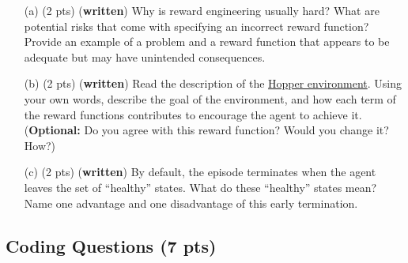 \documentclass{article}
\begin{document}
\begin{enumerate}

    \item[(a) (2 pts)] (\textbf{written}) Why is reward engineering usually hard? What are potential risks that come with specifying an incorrect reward function? Provide an example of a problem and a reward function that appears to be adequate but may have unintended consequences.

    \item[(b) (2 pts)] (\textbf{written}) Read the description of the \href{https://gymnasium.farama.org/environments/mujoco/hopper/}{Hopper environment}. Using your own words, describe the goal of the environment, and how each term of the reward functions contributes to encourage the agent to achieve it. (\textbf{Optional:} Do you agree with this reward function? Would you change it? How?)

    \item[(c) (2 pts)] (\textbf{written}) By default, the episode terminates when the agent leaves the set of ``healthy'' states. What do these ``healthy'' states mean? Name one advantage and one disadvantage of this early termination.
\end{enumerate}

\subsection{Coding Questions (7 pts)}
\end{document}
